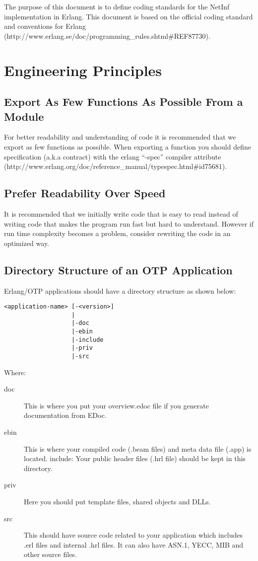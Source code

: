 The purpose of this document is to define coding standards for the NetInf implementation in Erlang. This document is based on the official coding standard and conventions for Erlang (http://www.erlang.se/doc/programming\_rules.shtml\#REF87730). 

\section{Engineering Principles}
\subsection{Export As Few Functions As Possible From a Module}
For better readability and understanding of code it is recommended that we export as few functions as possible. When exporting a function you should define specification (a.k.a contract) with the erlang “-spec” compiler attribute (http://www.erlang.org/doc/reference\_manual/typespec.html\#id75681). 

\subsection{Prefer Readability Over Speed}
It is recommended that we initially write code that is easy to read instead of writing code that makes the program run fast but hard to understand. However if run time complexity becomes a problem, consider rewriting the code in an optimized way. 

\subsection{Directory Structure of an OTP Application}
Erlang/OTP applications should have a directory structure as shown below:
\begin{lstlisting}	
<application-name> [-<version>]
                   |
                   |-doc
                   |-ebin
                   |-include
                   |-priv
                   |-src
\end{lstlisting}
Where: 
\begin{description}
\item[doc] This is where you put your overview.edoc file if you generate documentation from EDoc. 
\item[ebin] This is where your compiled code (.beam files) and meta data file (.app) is located. 
include: Your public header files (.hrl file) should be kept in this directory.  
\item[priv] Here you should put template files, shared objects and DLLs. 
\item[src] This should have source code related to your application which includes .erl files and internal .hrl files. It can also have ASN.1, YECC, MIB and other source files.
\end{description}

